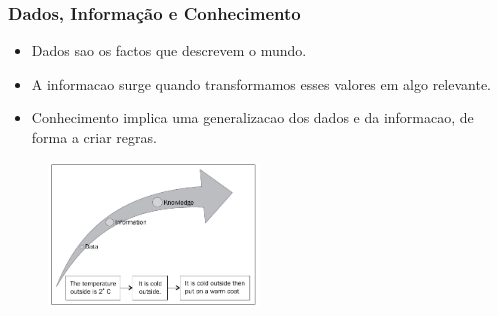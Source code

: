 \documentclass[hyperref={pdfpagelabels=true}]{beamer}
\begin{document}
\begin{frame}
\frametitle{Dados, Informa\c{c}\~{a}o e Conhecimento}

\small{ 
      \begin{itemize}    
        \item<1->Dados sao os factos que descrevem o mundo.%
        \item<1->A informacao surge quando transformamos esses valores em algo relevante.%
        \item<1->Conhecimento implica uma generalizacao dos dados e da informacao, de forma a criar regras.%
      \end{itemize}                
}

    \begin{figure}   
         \includegraphics[width=0.5\textwidth]{data.png}   
    \end{figure}     


\end{frame}
\end{document}
